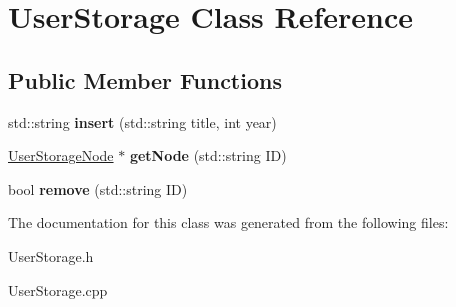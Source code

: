 \hypertarget{class_user_storage}{}\section{User\+Storage Class Reference}
\label{class_user_storage}
\subsection*{Public Member Functions}
\begin{DoxyCompactItemize}
\item 
\mbox{\label{class_user_storage_a9f7e580fafcd798cb9b440cbaba15e87}} 
std\+::string {\bfseries insert} (std\+::string title, int year)
\item 
\mbox{\label{class_user_storage_a5018e12946e2f827ec979cab39cb1a5f}} 
\hyperlink{class_user_storage_node}{User\+Storage\+Node} $\ast$ {\bfseries get\+Node} (std\+::string ID)
\item 
\mbox{\label{class_user_storage_ab5dc582ec267b47d5542ad1fcf69f938}} 
bool {\bfseries remove} (std\+::string ID)
\end{DoxyCompactItemize}


The documentation for this class was generated from the following files\+:\begin{DoxyCompactItemize}
\item 
User\+Storage.\+h\item 
User\+Storage.\+cpp\end{DoxyCompactItemize}
